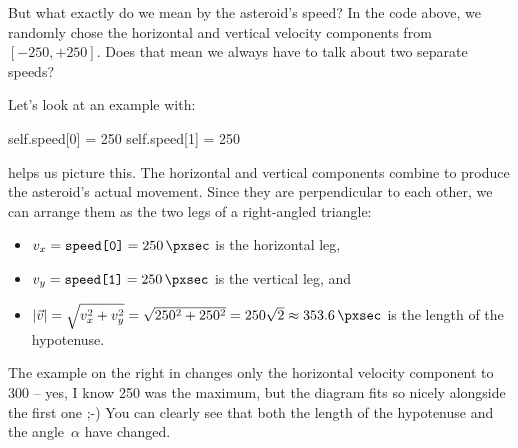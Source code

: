But what exactly do we mean by the asteroid's speed? In the code above, we randomly chose the horizontal and vertical velocity components from~$[-250, +250]$. Does that mean we always have to talk about two separate speeds?

Let's look at an example with:
\begin{codebox}
self.speed[0] = 250
self.speed[1] = 250	
\end{codebox}
 helps us picture this. The horizontal and vertical components combine to produce the asteroid's actual movement. Since they are perpendicular to each other, we can arrange them as the two legs of a right-angled triangle:
\begin{itemize}
	\item $v_x=\texttt{speed[0]}=\SI{250}{\pxsec}$ is the horizontal leg,
	\item $v_y=\texttt{speed[1]}=\SI{250}{\pxsec}$ is the vertical leg, and
	\item $|\vec v|=\sqrt{v_x^2+v_y^2} = \sqrt{250^2 + 250^2} = 250\sqrt{2} \approx \SI{353.6}{\pxsec}$ is the length of the hypotenuse.
\end{itemize}

The example on the right in  changes only the horizontal velocity component to \SI{300}{\pxsec} -- yes, I know \SI{250}{\pxsec} was the maximum, but the diagram fits so nicely alongside the first one ;-) You can clearly see that both the length of the hypotenuse and the angle~$\alpha$ have changed.


